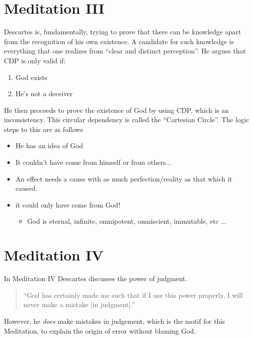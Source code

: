 \documentclass{article}
\begin{document}
    \begin{spacing}{1.2}
    \newpage
    \section{Meditation III}

    Descartes is, fundamentally, trying to prove that there can be knowledge apart from the recognition of his own existence. A candidate for such knowledge is everything that one realizes from ``clear and distinct perception''. He argues that CDP is only valid if:
    \begin{enumerate}
        \item God exists
        \item He's not a deceiver
    \end{enumerate}

    He then proceeds to prove the existence of God by using CDP, which is an 
    inconsistency. This circular dependency is called the 
    ``Cartesian Circle''. The logic steps to this are as follows
    \begin{itemize}
        \item He has an idea of God
        \item It couldn't have come from himself or from others...
        \item An effect needs a cause with as much perfection/reality as that which it caused.
        \item it could only have come from God!
        \begin{itemize}
            \item God is eternal, infinite, omnipotent, omniscient, immutable, etc ...
        \end{itemize}
    \end{itemize}
    \section{Meditation IV}

    In Meditation IV Descartes discusses the power of judgment. 
    \begin{quotation}
        ``God has certainly made me such that if I use this power properly, I will never make a mistake [in judgment].''
    \end{quotation}

    However, he \emph{does} make mistakes in judgement, which is the motif for this Meditation, to explain the origin of error without blaming God.


\end{spacing}
\end{document}
